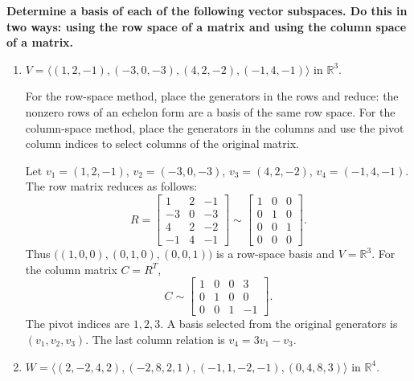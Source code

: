 \providecommand{\rank}{\operatorname{r}}
\providecommand{\RR}{\mathbb R}
\providecommand{\CC}{\mathbb C}
\providecommand{\KK}{\mathbb K}

\setcounter{enumi}{78}
\item {\bfseries\boldmath
Determine a basis of each of the following vector subspaces. Do this in two ways: using the row space of a matrix and using the column space of a matrix.
}

\begin{enumerate}[label=\alph*)]

\item $V=\langle(1,2,-1),(-3,0,-3),(4,2,-2),(-1,4,-1)\rangle$ in $\RR^3$.

\begin{answer}
For the row-space method, place the generators in the rows and reduce:
the nonzero rows of an echelon form are a basis of the same row space.
For the column-space method, place the generators in the columns and
use the pivot column indices to select columns of the original matrix.

Let $v_1=(1,2,-1)$, $v_2=(-3,0,-3)$, $v_3=(4,2,-2)$,
$v_4=(-1,4,-1)$. The row matrix reduces as follows:
\[
 R=\begin{bmatrix}1&2&-1\\-3&0&-3\\4&2&-2\\-1&4&-1\end{bmatrix}
 \sim\begin{bmatrix}1&0&0\\0&1&0\\0&0&1\\0&0&0\end{bmatrix}.
\]
Thus $\bigl((1,0,0),(0,1,0),(0,0,1)\bigr)$ is a row-space basis and $V=\RR^3$.
For the column matrix $C=R^T$,
\[
 C\sim\begin{bmatrix}1&0&0&3\\0&1&0&0\\0&0&1&-1\end{bmatrix}.
\]
The pivot indices are $1,2,3$. A basis selected from the original generators
is $(v_1,v_2,v_3)$. The last column relation is $v_4=3v_1-v_3$.
\end{answer}

\item $W=\langle(2,-2,4,2),(-2,8,2,1),(-1,1,-2,-1),(0,4,8,3)\rangle$ in $\RR^4$.


\end{enumerate}
